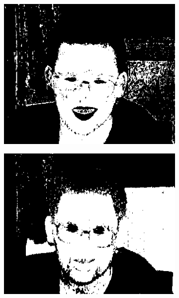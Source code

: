 \begin{figure}[h]
\begin{subfigure}[b]{0.18\textwidth}
         \includegraphics[width=\textwidth]{images/results/base/im00077_bayes.png}
     \end{subfigure}
     \hfill
     \begin{subfigure}[b]{0.18\textwidth}
         \centering
         \includegraphics[width=\textwidth]{images/results/base/im00077_dyc.png}
     \end{subfigure}
     \begin{subfigure}[b]{0.18\textwidth}
         \centering

\end{subfigure}
\end{figure}
